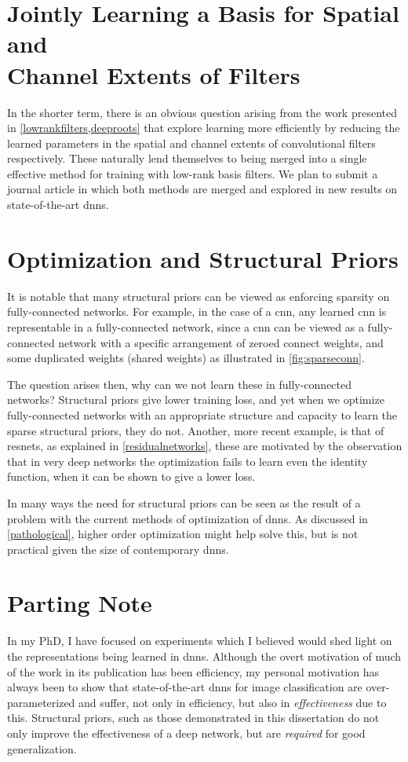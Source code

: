 \documentclass[thesis]{subfiles}
\begin{document}
\section[Jointly Learning a Basis for Spatial and Channel Extents of Filters]{Jointly Learning a Basis for Spatial and\texorpdfstring{\\}{ }Channel Extents of Filters}
\label{journalplan}
In the shorter term, there is an obvious question arising from the work presented in \cref{lowrankfilters,deeproots} that explore learning more efficiently by reducing the learned parameters in the spatial and channel extents of convolutional filters respectively. These naturally lend themselves to being merged into a single effective method for training with low-rank basis filters. We plan to submit a journal article in which both methods are merged and explored in new results on state-of-the-art \glspl{dnn}.

\section{Optimization and Structural Priors}\label{optimizationlink}
It is notable that many structural priors can be viewed as enforcing sparsity on fully-connected networks. For example, in the case of a \gls{cnn}, any learned \gls{cnn} is representable in a fully-connected network, since a \gls{cnn} can be viewed as a fully-connected network with a specific arrangement of zeroed connect weights, and some duplicated weights (shared weights) as illustrated in \cref{fig:sparseconn}. 

The question arises then, why can we not learn these in fully-connected networks? Structural priors give lower training loss, and yet when we optimize fully-connected networks with an appropriate structure and capacity to learn the sparse structural priors, they do not. Another, more recent example, is that of \glspl{resnet}, as explained in \cref{residualnetworks}, these are motivated by the observation that in very deep networks the optimization fails to learn even the identity function, when it can be shown to give a lower loss.

In many ways the need for structural priors can be seen as the result of a problem with the current methods of optimization of \glspl{dnn}. As discussed in \cref{pathological}, higher order optimization might help solve this, but is not practical given the size of contemporary \glspl{dnn}. 

\section{Parting Note}
In my PhD, I have focused on experiments which I believed would shed light on the representations being learned in \glspl{dnn}. Although the overt motivation of much of the work in its publication has been efficiency, my personal motivation has always been to show that state-of-the-art \glspl{dnn} for image classification are over-parameterized and suffer, not only in efficiency, but also in \emph{effectiveness} due to this. Structural priors, such as those demonstrated in this dissertation do not only improve the effectiveness of a deep network, but are \emph{required} for good generalization.
\end{document}
